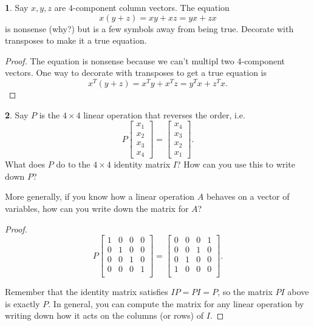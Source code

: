 \documentclass{article}
\theoremstyle{definition}
\newtheorem{prob}{}
\begin{document}
\begin{prob}
	Say $x, y, z$ are $4$-component column vectors. The equation
	$$x(y+z)=xy + xz = yx + zx$$
	is nonsense (why?) but is a few symbols away from being true. Decorate with transposes to make it a true equation.
\end{prob}
\begin{proof}
	The equation is nonsense because we can't multipl two 4-component vectors. One way to decorate with transposes to get a true equation is
	\[x^T(y+z)=x^Ty + x^T z=y^T x+ z^T x.\]
\end{proof}
 

\begin{prob}
Say $P$ is the $4 \times 4$ linear operation that reverses the order, i.e.
\[P \begin{bmatrix}
	x_1 \\ x_2 \\ x_3\\ x_4
\end{bmatrix}= \begin{bmatrix}
x_4 \\ x_3 \\ x_2\\ x_1
\end{bmatrix}.\]
What does $P$ do to the $4 \times 4$ identity matrix $I$? How can you use this to write down $P$?

More generally, if you know how a linear operation $A$ behaves on a vector of variables, how can you write down the matrix for $A$?
\end{prob}
\begin{proof}
	\[P\begin{bmatrix}
		1 & 0 & 0 & 0\\
		0& 1 & 0 & 0\\
		0& 0 & 1& 0\\
		0 & 0 & 0 & 1\\
	\end{bmatrix}= \begin{bmatrix}
	0 & 0 & 0 & 1\\
	0& 0 & 1 & 0\\
	0& 1 & 0& 0\\
	1 & 0 & 0 & 0\\
\end{bmatrix}.\]

Remember that the identity matrix satisfies $IP=PI=P$, so the matrix $PI$ above is exactly $P$. In general, you can compute the matrix for any linear operation by writing down how it acts on the columns (or rows) of $I$.
\end{proof}
\end{document}
